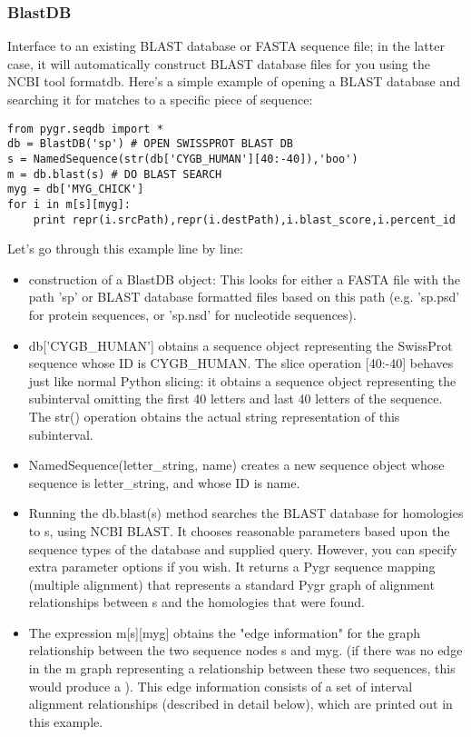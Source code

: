 \documentclass{howto}
\begin{document}
\subsubsection{BlastDB}
Interface to an existing BLAST database or FASTA sequence file; in the latter case, it will automatically construct BLAST database files for you using the NCBI tool formatdb. Here's a simple example of opening a BLAST database and searching it for matches to a specific piece of sequence:

\begin{verbatim}
from pygr.seqdb import *
db = BlastDB('sp') # OPEN SWISSPROT BLAST DB
s = NamedSequence(str(db['CYGB_HUMAN'][40:-40]),'boo')
m = db.blast(s) # DO BLAST SEARCH
myg = db['MYG_CHICK']
for i in m[s][myg]:
    print repr(i.srcPath),repr(i.destPath),i.blast_score,i.percent_id
\end{verbatim}

Let's go through this example line by line:

\begin{itemize}

\item    
construction of a BlastDB object: This looks for either a FASTA file with the path 'sp' or BLAST database formatted files based on this path (e.g. 'sp.psd' for protein sequences, or 'sp.nsd' for nucleotide sequences).

\item
db['CYGB_HUMAN'] obtains a sequence object representing the SwissProt sequence whose ID is CYGB_HUMAN.  The slice operation [40:-40] behaves just like normal Python slicing: it obtains a sequence object representing the subinterval omitting the first 40 letters and last 40 letters of the sequence.  The str() operation obtains the actual string representation of this subinterval.

\item
NamedSequence(letter_string, name) creates a new sequence object whose sequence is letter_string, and whose ID is name.

\item
Running the db.blast(s) method searches the BLAST database for homologies to s, using NCBI BLAST.  It chooses reasonable parameters based upon the sequence types of the database and supplied query.  However, you can specify extra parameter options if you wish.  It returns a Pygr sequence mapping (multiple alignment) that represents a standard Pygr graph of alignment relationships between s and the homologies that were found.

\item
The expression m[s][myg] obtains the "edge information" for the graph relationship between the two sequence nodes s and myg.  (if there was no edge in the m graph representing a relationship between these two sequences, this would produce a 
).  This edge information consists of a set of interval alignment relationships (described in detail below), which are printed out in this example.

\end{itemize}
\end{document}
